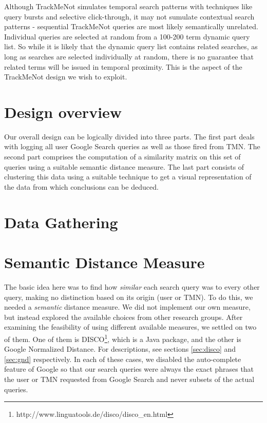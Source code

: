 \documentclass[11pt]{article}
\begin{document}
\begin{multicols}{2}
Although TrackMeNot simulates temporal search patterns with techniques
like query bursts and selective click-through, it may not sumulate
contextual search patterns - sequential TrackMeNot queries are most
likely semantically unrelated. Individual queries are selected at
random from a 100-200 term dynamic query list. So while it is likely
that the dynamic query list contains related searches, as long as
searches are selected individually at random, there is no guarantee
that related terms will be issued in temporal proximity. This is the
aspect of the TrackMeNot design we wish to exploit.

\section{Design overview}
\label{sec:design}
Our overall design can be logically divided into three parts. The
first part deals with logging all user Google Search queries as well
as those fired from TMN. The second part comprises the computation of
a similarity matrix on this set of queries using a suitable semantic
distance measure. The last part consists of clustering this data using
a suitable technique to get a visual representation of the data from
which conclusions can be deduced.

\section{Data Gathering}

\section{Semantic Distance Measure}
The basic idea here was to find how \textit{similar} each search query was to every other query, making no distinction based on its origin (user or TMN). To do this, we needed a \textit{semantic} distance measure. We did not implement our own measure, but instead explored the available choices from other research groups. After examining the feasibility of using different available measures, we settled on two of them. One of them is DISCO\footnote{http://www.linguatools.de/disco/disco\_en.html}, which is a Java package, and the other is Google Normalized Distance. For descriptions, see sections \ref{sec:disco} and \ref{sec:gnd} respectively. In each of these cases, we disabled the auto-complete feature of Google so that our search queries were always the exact phrases that the user or TMN requested from Google Search and never subsets of the actual queries.


\end{multicols}
\end{document}
